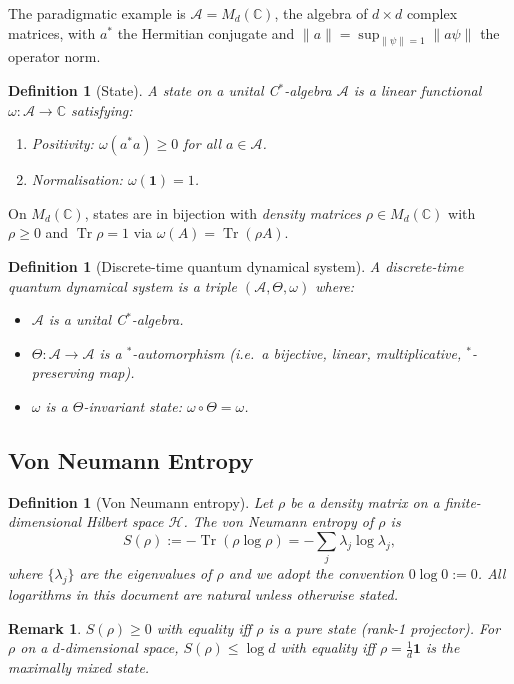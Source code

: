 \documentclass[12pt,a4paper]{article}
\newtheorem{definition}[theorem]{Definition}
\newtheorem{remark}[theorem]{Remark}
\DeclareMathOperator{\Tr}{Tr}
\newcommand{\HS}{\mathcal{H}}
\newcommand{\A}{\mathcal{A}}
\begin{document}
The paradigmatic example is $\A = M_d(\mathbb{C})$, the algebra of $d\times d$
complex matrices, with $a^*$ the Hermitian conjugate and $\|a\| =
\sup_{\|\psi\|=1}\|a\psi\|$ the operator norm.

\begin{definition}[State]
A \emph{state} on a unital C$^*$-algebra $\A$ is a linear functional
$\omega:\A\to\mathbb{C}$ satisfying:
\begin{enumerate}
  \item \emph{Positivity:} $\omega(a^*a)\geq 0$ for all $a\in\A$.
  \item \emph{Normalisation:} $\omega(\mathbf{1})=1$.
\end{enumerate}
\end{definition}

On $M_d(\mathbb{C})$, states are in bijection with \emph{density matrices}
$\rho\in M_d(\mathbb{C})$ with $\rho\geq 0$ and $\Tr\rho=1$ via
$\omega(A)=\Tr(\rho A)$.

\begin{definition}[Discrete-time quantum dynamical system]
A \emph{discrete-time quantum dynamical system} is a triple $(\A,\Theta,\omega)$
where:
\begin{itemize}
  \item $\A$ is a unital C$^*$-algebra.
  \item $\Theta:\A\to\A$ is a $^*$-automorphism (i.e.\ a bijective, linear,
        multiplicative, $^*$-preserving map).
  \item $\omega$ is a $\Theta$-invariant state: $\omega\circ\Theta=\omega$.
\end{itemize}
\end{definition}

\subsection{Von Neumann Entropy}

\begin{definition}[Von Neumann entropy]
Let $\rho$ be a density matrix on a finite-dimensional Hilbert space $\HS$.
The \emph{von Neumann entropy} of $\rho$ is
\[
  S(\rho) := -\Tr(\rho\log\rho) = -\sum_j \lambda_j \log\lambda_j,
\]
where $\{\lambda_j\}$ are the eigenvalues of $\rho$ and we adopt the convention
$0\log 0:=0$.  All logarithms in this document are natural unless otherwise
stated.
\end{definition}

\begin{remark}
$S(\rho)\geq 0$ with equality iff $\rho$ is a pure state (rank-1 projector).
For $\rho$ on a $d$-dimensional space, $S(\rho)\leq\log d$ with equality iff
$\rho = \frac{1}{d}\mathbf{1}$ is the maximally mixed state.
\end{remark}
\end{document}
